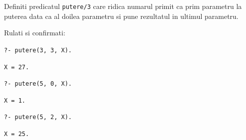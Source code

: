 Definiti predicatul \texttt{putere/3} care ridica numarul primit ca prim parametru la puterea data ca al doilea parametru si pune rezultatul in ultimul parametru.

Rulati si confirmati:

\texttt{?- putere(3, 3, X).}

\texttt{X = 27. }

\texttt{?- putere(5, 0, X).}

\texttt{X = 1.}

\texttt{?- putere(5, 2, X).}

\texttt{X = 25.}




